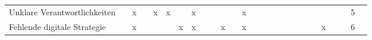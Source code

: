 \begin{sidewaystable}[ht]
\begin{tabular}{|p{6.5cm}|c|c|c|c|c|c|c|c|c|c|c|c|c|c|c|c|c|c|c|c|c|c|c|c|c|}
		Unklare Verantwortlichkeiten                    &                   & x                  &                    & x                    & x                  &                   & x                 &                      &                    &                      &                  & x                &                     &                  &                 &                      &                    &                 &                  &                  &                        &                      &                        & 5  \\
		Fehlende digitale Strategie                     &                   & x                  &                    &                      &                    & x                 & x                 &                      &                    & x                    &                  & x                &                     &                  &                 &                      &                    &                 &                  &                  & x                      &                      &                        & 6 \\
		\hline
	\end{tabular}
\end{sidewaystable}

